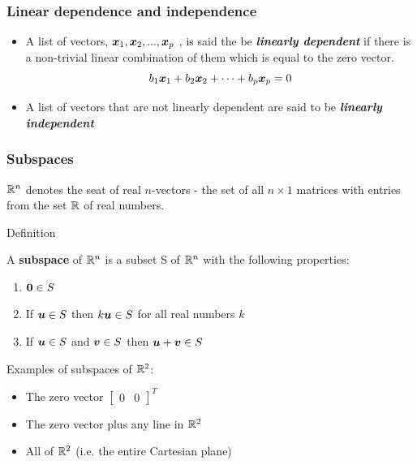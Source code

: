 \documentclass{beamer}
\begin{document}
\begin{frame}
  \frametitle{Linear dependence and independence}

\begin{itemize}

\item A list of vectors, $\bm{x}_1, \bm{x}_2, ..., \bm{x}_p$ , is said the be \emph{\textbf{linearly dependent}} if there is a non-trivial linear combination of them which is  equal to the zero vector.
\[
 b_1 \bm{x}_1 + b_2 \bm{x}_2 + \cdots + b_p \bm{x}_p = 0
\]

\item A list of vectors that are not linearly dependent are said to be \emph{\textbf{linearly independent}} 

\end{itemize}

\end{frame}





\begin{frame}
  \frametitle{Subspaces}

$\mathbb{R}^n$  denotes the seat of real $n$-vectors - the set of all $n \times 1$ matrices with entries from the set $\mathbb{R}$ of real numbers.
\medskip

\begin{block}{Definition}

A \textbf{subspace} of $\mathbb{R}^n$ is a subset S of $\mathbb{R}^n$ with the following properties:
\begin{enumerate}
	\item $\bm{0} \in S$
	\item If $\bm{u} \in S$ then $k\bm{u} \in S$ for all real numbers $k$
	\item If $\bm{u} \in S$ and  $\bm{v} \in S$ then $\bm{u} + \bm{v} \in S$
\end{enumerate}

\end{block}

Examples of subspaces of $\mathbb{R}^2$:
\begin{itemize}
	\item The zero vector $\begin{bmatrix}0 & 0\end{bmatrix}^T$
	\item The zero vector plus any line in $\mathbb{R}^2$
	\item All of $\mathbb{R}^2$ (i.e. the entire Cartesian plane)
\end{itemize}

\end{frame}
\end{document}
